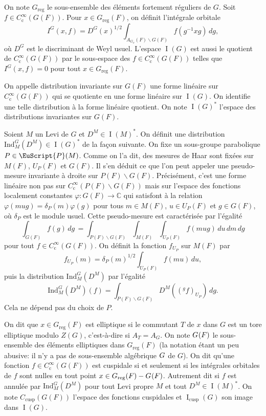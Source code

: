\documentclass[JEP,XML,SOM,Unicode,francais]{cedram}
\let\mathcal \EuScript
\newcommand{\NoChangel}[1]{%
\expandafter\let\csname old\string#1\endcsname=#1
\let#1=\relax
\newcommand{#1}{\mathcode`l="716C\csname old\string#1\endcsname\mathcode`l="7160 }%
}
\newcommand{\rc}{\mathrm{c}}
\newcommand{\cusp}{\mathrm{cusp}}
\newcommand{\rell}{\mathrm{ell}} \NoChangel{\rell}
\newcommand{\Ind}{\mathrm{Ind}}
\newcommand{\reg}{\mathrm{reg}}
\DeclareMathOperator{\rI}{I}
\newcommand{\cP}{\mathcal{P}}
\newcommand{\CC}{\mathbb{C}}
\theoremstyle{plain}
\theoremstyle{definition}
\begin{document}
On note $G_{\reg}$ le sous-ensemble des éléments fortement réguliers de $G$. Soit $f\in C_{\rc}^{\infty}(G(F))$. Pour $x\in G_{\reg}(F)$, on définit l'intégrale orbitale
\[
I^G(x,f)=D^G(x)^{1/2}\int_{A_{G_{x}}(F)\backslash G(F)}f(g^{-1}xg)\,dg,
\]
où $D^G$ est le discriminant de Weyl usuel. L'espace $\rI(G)$ est aussi le quotient de $C_{\rc}^{\infty}(G(F))$ par le sous-espace des $f\in C_{\rc}^{\infty}(G(F))$ telles que $I^G(x,f)=0$ pour tout $x\in G_{\reg}(F)$.

On appelle distribution invariante sur $G(F)$ une forme linéaire sur $C_{\rc}^{\infty}(G(F))$ qui se quotiente en une forme linéaire sur $\rI(G)$. On identifie une telle distribution à la forme linéaire quotient. On note $\rI(G)^*$ l'espace des distributions invariantes sur $G(F)$.

Soient $M$ un Levi de $G$ et $D^M\in \rI(M)^*$. On définit une distribution $\Ind_{M}^G(D^M)\in \rI(G)^*$ de la façon suivante. On fixe un sous-groupe parabolique $P\in \cP(M)$. Comme on l'a dit, des mesures de Haar sont fixées sur $M(F)$, $U_{P}(F)$ et $G(F)$. Il s'en déduit ce que l'on peut appeler une pseudo-mesure invariante à droite sur $P(F)\backslash G(F)$. Précisément, c'est une forme linéaire non pas sur $C_{\rc}^{\infty}(P(F)\backslash G(F))$ mais sur l'espace des fonctions localement constantes $\varphi:G(F)\to \CC$ qui satisfont à la relation $\varphi(mug)=\delta_{P}(m)\varphi(g)$ pour tous $m\in M(F)$, $u\in U_{P}(F)$ et $g\in G(F)$, où $\delta_{P}$ est le module usuel. Cette pseudo-mesure est caractérisée par l'égalité
\[
\int_{G(F)}f(g)\,dg\,=\int_{P(F)\backslash G(F)}\int_{M(F)}\int_{U_{P}(F)}f(mug)\,du\,dm\,dg
\]
pour tout $f\in C_{\rc}^{\infty}(G(F))$.
On définit la fonction $f_{U_{P}}$ sur $M(F)$ par
\[
f_{U_{P}}(m)=\delta_{P}(m)^{1/2}\int_{U_{P}(F)}f(mu)\,du,
\]
puis la distribution $\Ind_{M}^G(D^M)$ par l'égalité
\[
\Ind_{M}^G(D^M)(f)=\int_{P(F)\backslash G(F)}D^M(({^g}f)_{U_{P}})\,dg.
\]
Cela ne dépend pas du choix de $P$.

On dit que $x\in G_{\reg}(F)$ est elliptique si le commutant $T$ de $x$ dans $G$ est un tore elliptique modulo $Z(G)$, c'est-à-dire si $A_{T}=A_{G}$. On note $G_{\rell}(F)$ le sous-ensemble des éléments elliptiques dans $G_{\reg}(F)$ (la notation étant un peu abusive: il n'y a pas de sous-ensemble algébrique $G_{\rell}$ de $G$). On dit qu'une fonction $f\in C_{\rc}^{\infty}(G(F))$ est cuspidale si et seulement si les intégrales orbitales de $f$ sont nulles en tout point $x\in G_{\reg}(F)-G_{\rell}(F)$. Autrement dit si $f$ est annulée par $\Ind_{M}^G(D^M)$ pour tout Levi propre $M$ et tout $D^M\in \rI(M)^*$. On note $C_{\cusp}(G(F))$ l'espace des fonctions cuspidales et $\rI_{\cusp}(G)$ son image dans $\rI(G)$.
\end{document}
